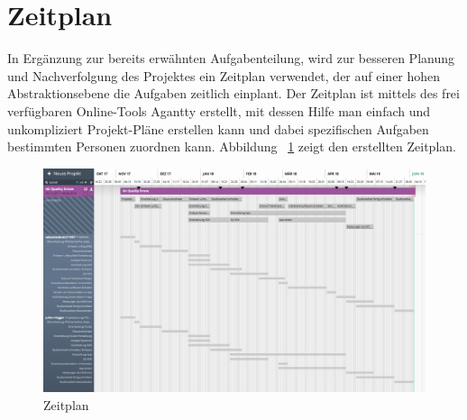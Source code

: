 \section{Zeitplan}\label{sec:Zeitplan}
In Ergänzung zur bereits erwähnten Aufgabenteilung, wird zur besseren Planung und Nachverfolgung des Projektes ein Zeitplan verwendet, der auf einer hohen Abstraktionsebene die Aufgaben zeitlich einplant. Der Zeitplan ist mittels des frei verfügbaren Online-Tools Agantty erstellt, mit dessen Hilfe man einfach und unkompliziert Projekt-Pläne erstellen kann und dabei spezifischen Aufgaben bestimmten Personen zuordnen kann. 
\newline 
\newline
Abbildung ~\ref{fig:Zeitplan} zeigt den erstellten Zeitplan.
\begin{figure}[H]
	\includegraphics[width=\textwidth]{images/Zeitplan.png}	
	\caption{Zeitplan}
	\label{fig:Zeitplan}
\end{figure}


